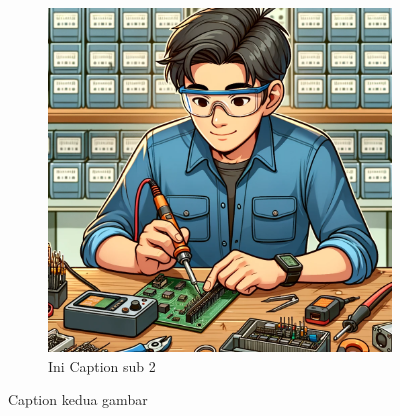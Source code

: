 \begin{figure}[H]
\begin{subfigure}[b]{0.4\linewidth}
        \centering
        \includegraphics[width=\linewidth]{img/contohgambar.png}
        \caption{Ini Caption sub 2\label{fig:inisub2}}
    \end{subfigure}
    \caption{Caption kedua gambar\label{fig:keduagambar}}
\end{figure}